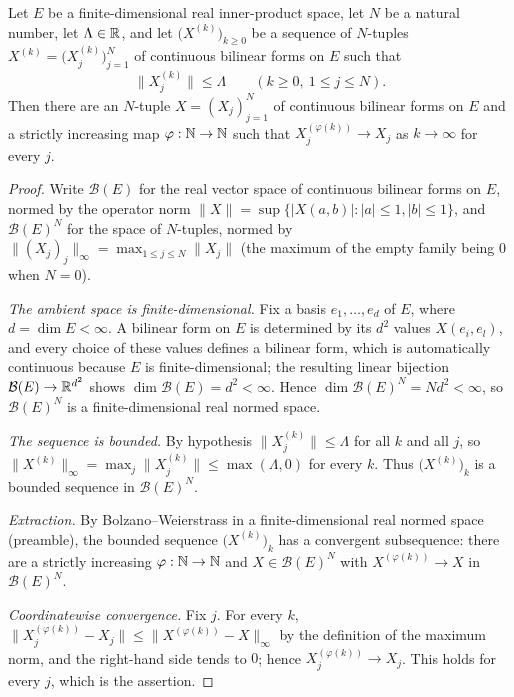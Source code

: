 \begin{lemma}
Let $E$ be a finite-dimensional real inner-product space, let $N$ be a natural
number, let $\Lambda\in\mathbb{R}$, and let $\bigl(X^{(k)}\bigr)_{k\ge0}$ be a sequence
of $N$-tuples $X^{(k)}=\bigl(X^{(k)}_j\bigr)_{j=1}^N$ of continuous bilinear
forms on $E$ such that
\[
  \bigl\|X^{(k)}_j\bigr\|\le\Lambda\qquad(k\ge0,\ 1\le j\le N).
\]
Then there are an $N$-tuple $X=(X_j)_{j=1}^N$ of continuous bilinear forms on $E$
and a strictly increasing map $\varphi:\mathbb{N}\to\mathbb{N}$ such that
$X^{(\varphi(k))}_j\to X_j$ as $k\to\infty$ for every $j$.
\end{lemma}
\begin{proof}
Write $\mathcal B(E)$ for the real vector space of continuous bilinear forms on
$E$, normed by the operator norm $\|X\|=\sup\{|X(a,b)|:|a|\le1,|b|\le1\}$, and
$\mathcal B(E)^N$ for the space of $N$-tuples, normed by
$\|(X_j)_j\|_\infty=\max_{1\le j\le N}\|X_j\|$ (the maximum of the empty family
being $0$ when $N=0$).

\emph{The ambient space is finite-dimensional.}
Fix a basis $e_1,\ldots,e_d$ of $E$, where $d=\dim E<\infty$. A bilinear form on
$E$ is determined by its $d^2$ values $X(e_i,e_l)$, and every choice of these
values defines a bilinear form, which is automatically continuous because $E$ is
finite-dimensional; the resulting linear bijection $\mathcal B(E)\to\mathbb{R}^{d^2}$
shows $\dim\mathcal B(E)=d^2<\infty$. Hence
$\dim\mathcal B(E)^N=Nd^2<\infty$, so $\mathcal B(E)^N$ is a
finite-dimensional real normed space.

\emph{The sequence is bounded.}
By hypothesis $\bigl\|X^{(k)}_j\bigr\|\le\Lambda$ for all $k$ and all $j$, so
$\bigl\|X^{(k)}\bigr\|_\infty=\max_j\bigl\|X^{(k)}_j\bigr\|\le\max(\Lambda,0)$
for every $k$. Thus $\bigl(X^{(k)}\bigr)_k$ is a bounded sequence in
$\mathcal B(E)^N$.

\emph{Extraction.}
By Bolzano--Weierstrass in a finite-dimensional real normed space (preamble),
the bounded sequence $\bigl(X^{(k)}\bigr)_k$ has a convergent subsequence: there
are a strictly increasing $\varphi:\mathbb{N}\to\mathbb{N}$ and $X\in\mathcal B(E)^N$ with
$X^{(\varphi(k))}\to X$ in $\mathcal B(E)^N$.

\emph{Coordinatewise convergence.}
Fix $j$. For every $k$,
$\bigl\|X^{(\varphi(k))}_j-X_j\bigr\|\le
\bigl\|X^{(\varphi(k))}-X\bigr\|_\infty$ by the definition of the maximum norm,
and the right-hand side tends to $0$; hence $X^{(\varphi(k))}_j\to X_j$. This
holds for every $j$, which is the assertion.
\end{proof}

